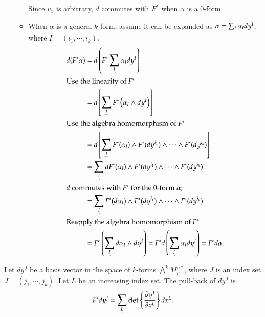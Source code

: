 \documentclass[11pt, a4paper]{book}
\begin{document}
\begin{enumerate}
\begin{Proof}
\begin{itemize}
      Since $v_x$ is arbitrary, $d$ commutes with $F^{*}$ when $\alpha$ is a 0-form.
    \item When $\alpha$ is a general $k$-form, assume it can be expanded as
      $\alpha = \sum_{\underaccent{\rightharpoondown}{I}} \alpha_I dy^{I}$, where
      $I = (i_1,\cdots,i_k)$.
      \begin{align*}
        d(F^{*}\alpha)
        &= d \left( F^{*}\sum_{\underaccent{\rightharpoondown}{I}}
          \alpha_I dy^I \right) \\
        \intertext{Use the linearity of $F^{*}$}
        &= d \left[
          \sum_{\underaccent{\rightharpoondown}{I}} F^{*} \left( \alpha_I \wedge dy^I
          \right) \right] \\
        \intertext{Use the algebra homomorphism of $F^{*}$}
        &= d \left[ \sum_{\underaccent{\rightharpoondown}{I}} F^{*}(\alpha_I) \wedge
          F^{*}(dy^{i_1}) \wedge \cdots \wedge F^{*}(dy^{i_k}) \right] \\
        &= \sum_{\underaccent{\rightharpoondown}{I}} d F^{*}(\alpha_I) \wedge
          F^{*}(dy^{i_1}) \wedge \cdots \wedge F^{*}(dy^{i_k}) \\
        \intertext{$d$ commutes with $F^{*}$ for the 0-form $\alpha_I$}
        &= \sum_{\underaccent{\rightharpoondown}{I}} F^{*}(d\alpha_I) \wedge
          F^{*}(dy^{i_1}) \wedge \cdots \wedge F^{*}(dy^{i_k}) \\
        \intertext{Reapply the algebra homomorphism of $F^{*}$}
        &= F^{*} \left( \sum_{\underaccent{\rightharpoondown}{I}} d\alpha_I \wedge dy^I \right) =
          F^{*} d \left( \sum_{\underaccent{\rightharpoondown}{I}} \alpha_I dy^I \right) =
          F^{*} d\alpha.
      \end{align*}
    \end{itemize}
  \end{Proof}
\end{enumerate}

\begin{Proposition}
  \label{prop:pullback-of-basis}
  Let $dy^J$ be a basis vector in the space of $k$-forms $\bigwedge^k M_p^{n*}$, where $J$
  is an index set $J=(j_1,\cdots,j_k)$. Let $L$ be an increasing index set. The pull-back
  of $dy^J$ is
  \begin{equation}
    \label{eq:pullback-of-basis}
    F^{*}dy^J = \sum_{\underaccent{\rightharpoondown}{L}} \det \left\{
      \frac{\pdiff y^J}{\pdiff x^L} \right\} dx^L.
  \end{equation}
\end{Proposition}
\end{document}
